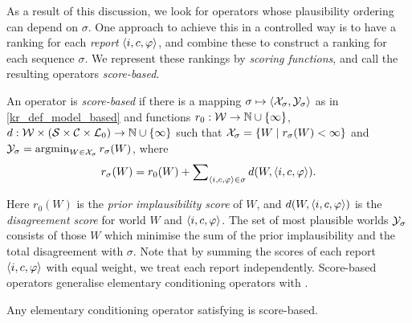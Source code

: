 
As a result of this discussion, we look for operators whose plausibility
ordering can depend on $\sigma$. One approach to achieve this in a controlled
way is to have a ranking for each
\emph{report} $\langle {i, c, \varphi} \rangle$, and combine these to construct a ranking
for each sequence $\sigma$. We represent these rankings by \emph{scoring
functions}, and call the resulting operators \emph{score-based}.

\begin{definition}
\label{kr_def_score_based}
    An operator is \emph{score-based} if there is a mapping $\sigma \mapsto
    \langle {\mathcal{X}_\sigma, \mathcal{Y}_\sigma} \rangle$ as in \cref{kr_def_model_based} and functions
    $r_0: \mathcal{W} \to \mathbb{N} \cup \{\infty\}$, $d: \mathcal{W} \times (\mathcal{S} \times \mathcal{C} \times \mathcal{L}{}_0) \to \mathbb{N} \cup \{\infty\}$
    such that $\mathcal{X}_\sigma = \{W \mid r_\sigma(W) < \infty\}$ and $\mathcal{Y}_\sigma =
    \operatorname{argmin}_{W \in \mathcal{X}_\sigma}{r_\sigma(W)}$, where
    \[
        r_\sigma(W) = r_0(W) + \sum\nolimits_{\langle {i, c, \varphi} \rangle \in \sigma}{
            d(W, \langle {i, c, \varphi} \rangle)
        }.
    \]

\end{definition}

Here $r_0(W)$ is the \emph{prior implausibility score} of $W$, and $d(W,
\langle {i, c, \varphi} \rangle)$ is the \emph{disagreement score} for world $W$ and $\langle {i,
c, \varphi} \rangle$. The set of most plausible worlds $\mathcal{Y}_\sigma$ consists of those $W$
which minimise the sum of the prior implausibility and the total
disagreement with $\sigma$. Note that by summing the scores
of each report $\langle {i, c, \varphi} \rangle$ with equal weight, we treat each report independently.
%
Score-based operators generalise elementary conditioning operators with \kconj{}.

\begin{proposition}
\label{kr_prop_kconj_conditioning_implies_score_based}
    Any elementary conditioning operator satisfying \kconj{} is score-based.
\end{proposition}

